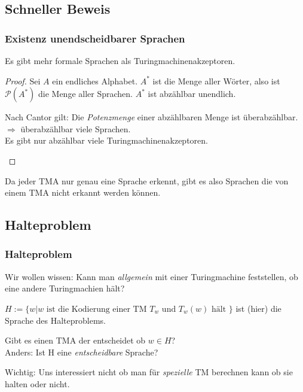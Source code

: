 \subsection{Schneller Beweis}
\begin{frame}
  \frametitle{Existenz unendscheidbarer Sprachen}
  \begin{theorem}
    Es gibt mehr formale Sprachen als Turingmachinenakzeptoren.
  \end{theorem}
  \begin{proof}
    Sei $A$ ein endliches Alphabet. $A^*$ ist die Menge aller Wörter,
    also ist $\mathcal{P}(A^*)$ die Menge aller Sprachen. $A^*$ ist abzählbar unendlich.
    \begin{block}{Nach Cantor gilt:}
    Die \emph{Potenzmenge} einer abzählbaren Menge ist überabzählbar.\\
    $\Rightarrow$ überabzählbar viele Sprachen.\\
     Es gibt nur abzählbar viele Turingmachinenakzeptoren.
    \end{block}
  \end{proof}
  Da jeder TMA nur genau eine Sprache erkennt, gibt es also Sprachen die von einem TMA nicht erkannt werden können.
\end{frame}
\subsection{Halteproblem}
\begin{frame}
  \frametitle{Halteproblem}
  Wir wollen wissen: Kann man \emph{allgemein} mit einer Turingmachine feststellen, ob eine andere Turingmachien hält?
  \begin{definition}
    $H := \{w | w \text{ ist die Kodierung einer TM } T_w \text{ und } T_w(w) \text{ hält }\}$ ist (hier) die Sprache des Halteproblems.
  \end{definition}
  \pause
  \begin{block}{}
  Gibt es einen TMA der entscheidet ob $w \in H$?\\
  Anders: Ist H eine \emph{entscheidbare} Sprache? 
  \end{block}
  \begin{alertblock}{Wichtig:}
    Uns interessiert nicht ob man für \emph{spezielle} TM berechnen kann ob sie halten oder nicht.
  \end{alertblock}
\end{frame}
